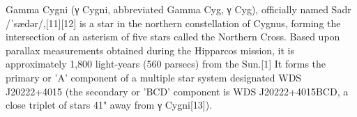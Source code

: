 Gamma Cygni (γ Cygni, abbreviated Gamma Cyg, γ Cyg), officially named Sadr /ˈsædər/,[11][12] is a star in the northern constellation of Cygnus, forming the intersection of an asterism of five stars called the Northern Cross. Based upon parallax measurements obtained during the Hipparcos mission, it is approximately 1,800 light-years (560 parsecs) from the Sun.[1] It forms the primary or 'A' component of a multiple star system designated WDS J20222+4015 (the secondary or 'BCD' component is WDS J20222+4015BCD, a close triplet of stars 41" away from γ Cygni[13]).


